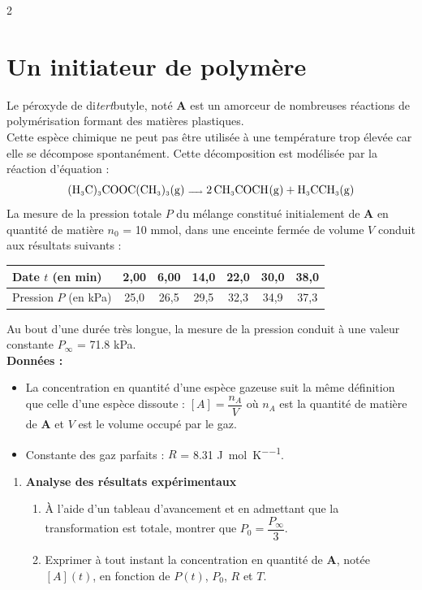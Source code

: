 \documentclass[a4paper,11pt,fleqn]{article}%
\begin{document}
\begin{multicols}{2}
\section{Un initiateur de polymère}
Le péroxyde de di\textit{tert}butyle, noté \textbf{A} est un amorceur de nombreuses réactions de polymérisation formant des matières plastiques.\\
Cette espèce chimique ne peut pas être utilisée à une température trop élevée car elle se décompose spontanément. Cette décomposition est modélisée par la réaction d'équation :
$$\tiny \ce{(H3C)3COOC(CH3)3(g) -> 2CH3COCH(g) + H3CCH3(g)}$$
La mesure de la pression totale $P$ du mélange constitué initialement de \textbf{A} en quantité de matière $n_0$ = \num{10} \unit{\milli\mole}, dans une enceinte fermée de volume $V$ conduit aux résultats suivants :
\begin{center}
\begin{tabular}{|>{\centering}m{.15\linewidth}|c|c|c|c|c|c|}
    \hline Date $t$ (en \unit{\minute}) & 2,00 & 6,00 & 14,0 & 22,0 & 30,0 & 38,0 \\
    \hline Pression $P$ (en \unit{\kilo\pascal}) & 25,0 & 26,5 & 29,5 & 32,3 & 34,9 & 37,3\\
    \hline
\end{tabular}
\end{center}
Au bout d'une durée très longue, la mesure de la pression conduit à une valeur constante $P_{\infty}$ = \num{71,8} \unit{\kilo\pascal}.\\
\textbf{Données :}
\begin{itemize}
    \item La concentration en quantité d'une espèce gazeuse suit la même définition que celle d'une espèce dissoute : $[A] = \dfrac{n_A}{V}$ où $n_A$ est la quantité de matière de \textbf{A} et $V$ est le volume occupé par le gaz.
    \item Constante des gaz parfaits : $R$ = \num{8,31} \unit{\joule\per\mole\per\kelvin}.
\end{itemize}
\begin{enumerate}
    \item \textbf{Analyse des résultats expérimentaux}
    \begin{enumerate}
        \item À l'aide d'un tableau d'avancement et en admettant que la transformation est totale, montrer que $P_0 = \dfrac{P_{\infty}}{3}$.
        \item Exprimer à tout instant la concentration en quantité de \textbf{A}, notée $[A](t)$, en fonction de $P(t)$, $P_0$, $R$ et $T$.

\end{enumerate}
\end{enumerate}
\end{multicols}
\end{document}
